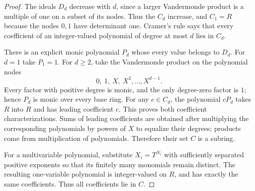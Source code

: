 \documentclass[11pt,a4paper]{article}
\theoremstyle{definition}
\begin{document}
\begin{proof}
The ideals $D_d$ decrease with $d$, since a
larger Vandermonde product is a multiple of
one on a subset of its nodes. Thus the $C_d$
increase, and $C_1=R$ because the nodes $0,1$
have determinant one.
Cramer's rule says that every coefficient of
an integer-valued polynomial of degree at most
$d$ lies in $C_d$.

There is an explicit monic polynomial $P_d$
whose every value belongs to $D_d$. For $d=1$
take $P_1=1$. For $d\ge2$, take the Vandermonde
product on the polynomial nodes
\[
                     0,\ 1,\ X,\ X^2,\ldots,X^{d-1}.
\]
Every factor with positive degree is monic,
and the only degree-zero factor is $1$; hence
$P_d$ is monic over every base ring.
For any $c\in C_d$, the polynomial $cP_d$
takes $R$ into $R$ and has leading coefficient
$c$. This proves both coefficient characterizations.
Sums of leading coefficients are obtained after
multiplying the corresponding polynomials by
powers of $X$ to equalize their degrees; products
come from multiplication of polynomials.
Therefore their set $C$ is a subring.

For a multivariable polynomial, substitute
$X_i=T^{N_i}$ with sufficiently separated
positive exponents so that its finitely many
monomials remain distinct. The resulting
one-variable polynomial is integer-valued on
$R$, and has exactly the same coefficients.
Thus all coefficients lie in $C$.


\end{proof}
\end{document}
